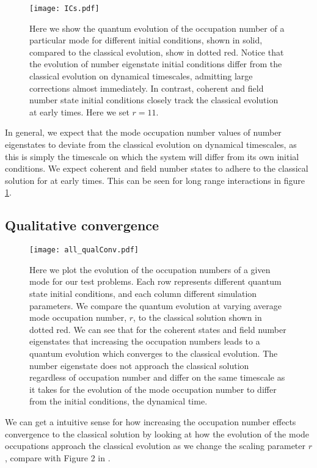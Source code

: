 \documentclass[aps,prd,twocolumn,superscriptaddress]{revtex4-1}
\begin{document}
\begin{figure}
	\texttt{[image: ICs.pdf]}
	\caption{ Here we show the quantum evolution of the occupation number of a particular mode for different initial conditions, shown in solid, compared to the classical evolution, show in dotted red. Notice that the evolution of number eigenstate initial conditions differ from the classical evolution on dynamical timescales, admitting large corrections almost immediately. In contrast, coherent and field number state initial conditions closely track the classical evolution at early times. Here we set $r=11$. }
	\label{fig:ICs}
\end{figure}

In general, we expect that the mode occupation number values of number eigenstates to deviate from the classical evolution on dynamical timescales, as this is simply the timescale on which the system will differ from its own initial conditions. We expect coherent and field number states to adhere to the classical solution for at early times. This can be seen for long range interactions in figure \ref{fig:ICs}.

\subsection{Qualitative convergence}

\begin{figure*}
	\texttt{[image: all\_qualConv.pdf]}
	\caption{ Here we plot the evolution of the occupation numbers of a given mode for our test problems. Each row represents different quantum state initial conditions, and each column different simulation parameters. We compare the quantum evolution at varying average mode occupation number, $r$, to the classical solution shown in dotted red. We can see that for the coherent states and field number eigenstates that increasing the occupation numbers leads to a quantum evolution which converges to the classical evolution. The number eigenstate does not approach the classical solution regardless of occupation number and differ on the same timescale as it takes for the evolution of the mode occupation number to differ from the initial conditions, the dynamical time. }
	\label{fig:qualConv}
\end{figure*}

We can get a intuitive sense for how increasing the occupation number effects convergence to the classical solution by looking at how the evolution of the mode occupations approach the classical evolution as we change the scaling parameter $r$, compare with Figure 2 in \cite{Sikivie2017}. 
\end{document}
